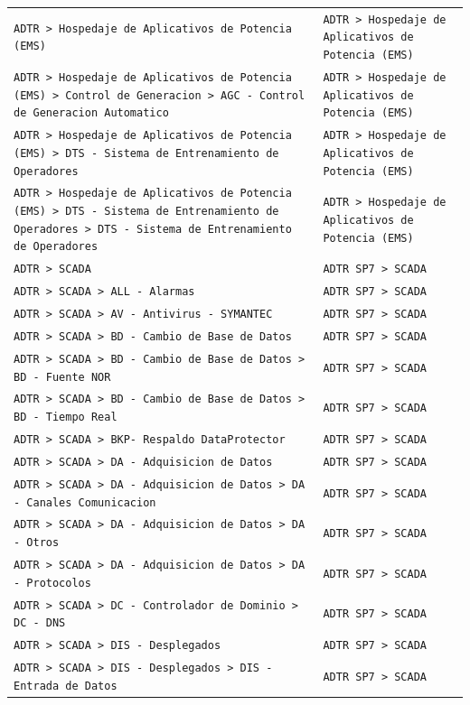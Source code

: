 \begin{longtable}{>{\raggedright\arraybackslash}p{} >{\raggedright\arraybackslash}p{}}
\texttt{ADTR > Hospedaje de Aplicativos de Potencia (EMS)} & \texttt{ADTR > Hospedaje de Aplicativos de Potencia (EMS)} \\
\texttt{ADTR > Hospedaje de Aplicativos de Potencia (EMS) > Control de Generacion > AGC - Control de Generacion Automatico} & \texttt{ADTR > Hospedaje de Aplicativos de Potencia (EMS)} \\
\texttt{ADTR > Hospedaje de Aplicativos de Potencia (EMS) > DTS - Sistema de Entrenamiento de Operadores} & \texttt{ADTR > Hospedaje de Aplicativos de Potencia (EMS)} \\
\texttt{ADTR > Hospedaje de Aplicativos de Potencia (EMS) > DTS - Sistema de Entrenamiento de Operadores > DTS - Sistema de Entrenamiento de Operadores} & \texttt{ADTR > Hospedaje de Aplicativos de Potencia (EMS)} \\
\texttt{ADTR > SCADA} & \texttt{ADTR SP7 > SCADA} \\
\texttt{ADTR > SCADA > ALL - Alarmas} & \texttt{ADTR SP7 > SCADA} \\
\texttt{ADTR > SCADA > AV - Antivirus - SYMANTEC} & \texttt{ADTR SP7 > SCADA} \\
\texttt{ADTR > SCADA > BD - Cambio de Base de Datos} & \texttt{ADTR SP7 > SCADA} \\
\texttt{ADTR > SCADA > BD - Cambio de Base de Datos > BD - Fuente NOR} & \texttt{ADTR SP7 > SCADA} \\
\texttt{ADTR > SCADA > BD - Cambio de Base de Datos > BD - Tiempo Real} & \texttt{ADTR SP7 > SCADA} \\
\texttt{ADTR > SCADA > BKP- Respaldo DataProtector} & \texttt{ADTR SP7 > SCADA} \\
\texttt{ADTR > SCADA > DA - Adquisicion de Datos} & \texttt{ADTR SP7 > SCADA} \\
\texttt{ADTR > SCADA > DA - Adquisicion de Datos > DA - Canales Comunicacion} & \texttt{ADTR SP7 > SCADA} \\
\texttt{ADTR > SCADA > DA - Adquisicion de Datos > DA - Otros} & \texttt{ADTR SP7 > SCADA} \\
\texttt{ADTR > SCADA > DA - Adquisicion de Datos > DA - Protocolos} & \texttt{ADTR SP7 > SCADA} \\
\texttt{ADTR > SCADA > DC - Controlador de Dominio > DC - DNS} & \texttt{ADTR SP7 > SCADA} \\
\texttt{ADTR > SCADA > DIS - Desplegados} & \texttt{ADTR SP7 > SCADA} \\
\texttt{ADTR > SCADA > DIS - Desplegados > DIS - Entrada de Datos} & \texttt{ADTR SP7 > SCADA} \\

\end{longtable}
